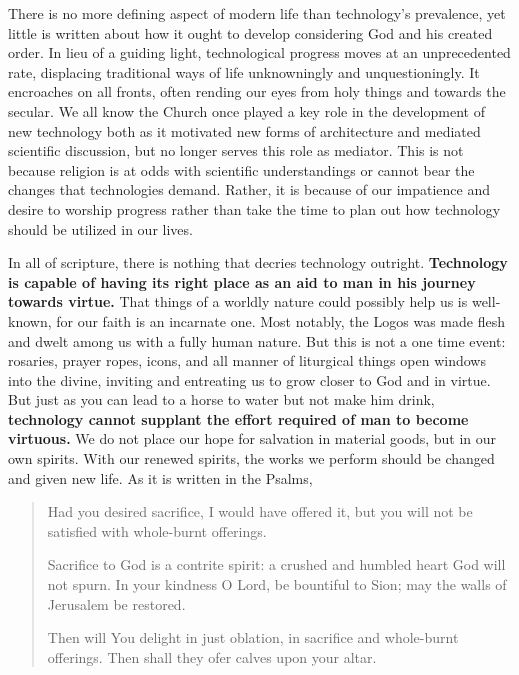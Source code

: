 \documentclass[letterpaper]{article}
\begin{document}
There is no more defining aspect of modern life than technology's prevalence, yet little is written about how it ought to develop considering God and his created order. In lieu of a guiding light, technological progress moves at an unprecedented rate, displacing traditional ways of life unknowningly and unquestioningly. It encroaches on all fronts, often rending our eyes from holy things and towards the secular. We all know the Church once played a key role in the development of new technology both as it motivated new forms of architecture and mediated scientific discussion, but no longer serves this role as mediator. This is not because religion is at odds with scientific understandings or cannot bear the changes that technologies demand. Rather, it is because of our impatience and desire to worship progress rather than take the time to plan out how technology should be utilized in our lives.


In all of scripture, there is nothing that decries technology outright. \textbf{Technology is capable of having its right place as an aid to man in his journey towards virtue.} That things of a worldly nature could possibly help us is well-known, for our faith is an incarnate one. Most notably, the Logos was made flesh and dwelt among us with a fully human nature. But this is not a one time event: rosaries, prayer ropes, icons, and all manner of liturgical things open windows into the divine, inviting and entreating us to grow closer to God and in virtue. But just as you can lead to a horse to water but not make him drink, \textbf{technology cannot supplant the effort required of man to become virtuous.} We do not place our hope for salvation in material goods, but in our own spirits. With our renewed spirits, the works we perform should be changed and given new life. As it is written in the Psalms,

\begin{quote}
  Had you desired sacrifice, I would have offered it,
  but you will not be satisfied with whole-burnt offerings.

  Sacrifice to God is a contrite spirit:
  a crushed and humbled heart God will not spurn.
  In your kindness O Lord, be bountiful to Sion;
  may the walls of Jerusalem be restored.

  Then will You delight in just oblation,
  in sacrifice and whole-burnt offerings.
  Then shall they ofer calves upon your altar.
\end{quote}
\end{document}
